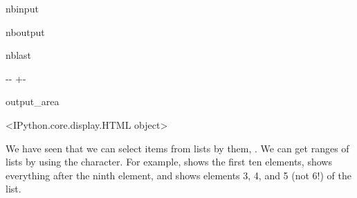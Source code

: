 \documentclass[letterpaper,10pt,english]{sphinxmanual}
\newlength\nbsphinxcodecellspacing
\begin{document}
\begin{sphinxuseclass}{nbinput}
{
\begin{sphinxVerbatim}[commandchars=\\\{\}]
\llap{\color{nbsphinxin}[16]:\,\hspace{\fboxrule}\hspace{\fboxsep}}\PYG{p}{[}\PYG{p}{]}
\end{sphinxVerbatim}
}

\end{sphinxuseclass}
\begin{sphinxuseclass}{nboutput}
\begin{sphinxuseclass}{nblast}
{

\kern-\sphinxverbatimsmallskipamount\kern-\baselineskip
\kern+\FrameHeightAdjust\kern-\fboxrule
\vspace{\nbsphinxcodecellspacing}

\begin{sphinxuseclass}{output_area}
\begin{sphinxuseclass}{}


\begin{sphinxVerbatim}[commandchars=\\\{\}]
<IPython.core.display.HTML object>
\end{sphinxVerbatim}



\end{sphinxuseclass}
\end{sphinxuseclass}
}

\end{sphinxuseclass}
\end{sphinxuseclass}
\sphinxAtStartPar
We have seen that we can select items from lists by  them, . We can get ranges of lists by using the \sphinxcode{\sphinxupquote{:}} character. For example,  shows the first ten elements,  shows everything after the ninth element, and  shows elements 3, 4, and 5 (not 6!) of the list.
\end{document}

